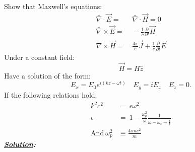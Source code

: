 \documentclass[notitlepage]{report}
\begin{document}
\begin{question}[title = Question 4]{}{}
Show that Maxwell's equations:\\
\begin{align}
	\bar{\nabla}\cdot \vec{E}  =&\  \bar{\nabla}\cdot \vec{H} = 0\label{mx1}\\
	\bar{\nabla}\times \vec{E} =&\  -\frac{1}{c}\frac{\partial}{\partial t}\vec{H}\label{mx2}\\
	\bar{\nabla}\times \vec{H} =&\  \frac{4\pi}{c}\vec{J}+\frac{1}{c}\frac{\partial}{\partial t}\vec{E}\label{mx3}
\end{align}
Under a constant field:\\
\begin{equation}
	\vec{H}=H\hat{z}\label{H}
\end{equation}
Have a solution of the form:\\
\[
	E_x=E_0e^{i\left(kz-\omega t\right)}\quad E_y=iE_x\quad E_z=0
.\] 
\tcbbreak
If the following relations hold:\\
\begin{align*}
	k^2c^2 &=\  \epsilon\omega^2\\
	\epsilon &=\  1-\frac{\omega_p^2}{\omega}\frac{1}{\omega-\omega_c+\frac{i}{\tau}}\\
	\text{And}\ \omega_p^2 &\equiv \frac{4\pi ne^2}{m}
\end{align*}
\tcblower
\textbf{\emph{\underline{Solution}:}}\


\end{question}
\end{document}
